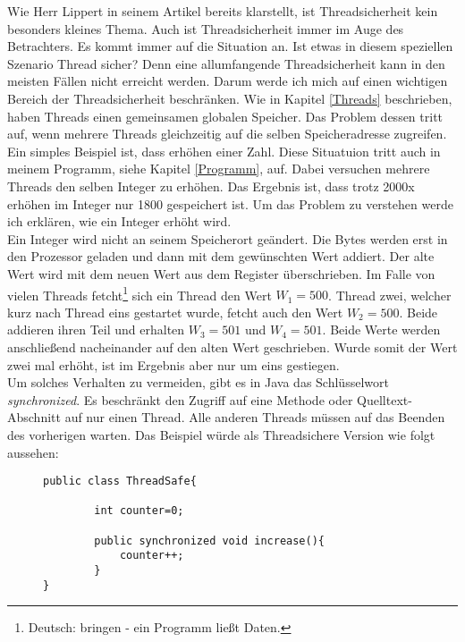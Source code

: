 Wie Herr Lippert in seinem Artikel bereits klarstellt, ist Threadsicherheit kein besonders kleines Thema. Auch ist Threadsicherheit immer im Auge des Betrachters. Es kommt immer auf die Situation an. Ist etwas in diesem speziellen Szenario Thread sicher? Denn eine allumfangende Threadsicherheit kann in den meisten Fällen nicht erreicht werden. Darum werde ich mich auf einen wichtigen Bereich der Threadsicherheit beschränken.
\medskip
\newline
Wie in Kapitel \ref{Threads} beschrieben, haben Threads einen gemeinsamen globalen Speicher. Das Problem dessen tritt auf, wenn mehrere Threads gleichzeitig auf die selben Speicheradresse zugreifen. Ein simples Beispiel ist, dass erhöhen einer Zahl. Diese Situatuion tritt auch in meinem Programm, siehe Kapitel \ref{Programm}, auf. Dabei versuchen mehrere Threads den selben Integer zu erhöhen. Das Ergebnis ist, dass trotz 2000x erhöhen im Integer nur 1800 gespeichert ist. Um das Problem zu verstehen werde ich erklären, wie ein Integer erhöht wird.\\
Ein Integer wird nicht an seinem Speicherort geändert. Die Bytes werden erst in den Prozessor geladen und dann mit dem gewünschten Wert addiert. Der alte Wert wird mit dem neuen Wert aus dem Register überschrieben. Im Falle von vielen Threads fetcht\footnote{Deutsch: bringen - ein Programm ließt Daten.} sich ein Thread den Wert $W_1 = 500$. Thread zwei, welcher kurz nach Thread eins gestartet wurde, fetcht auch den Wert $W_2 = 500$. Beide addieren ihren Teil und erhalten $W_3 = 501$ und $W_4 = 501$. Beide Werte werden anschließend nacheinander auf den alten Wert geschrieben. Wurde somit der Wert zwei mal erhöht, ist im Ergebnis aber nur um eins gestiegen.\cite{ThreadInterference:Oracle}\\
Um solches Verhalten zu vermeiden, gibt es in Java das Schlüsselwort \textit{synchronized}. Es beschränkt den Zugriff auf eine Methode oder Quelltext-Abschnitt auf nur einen Thread. Alle anderen Threads müssen auf das Beenden des vorherigen warten. Das Beispiel würde als Threadsichere Version wie folgt aussehen: \cite{SynchronizedMethods:Oracle}
\begin{figure}[h]
    \begin{lstlisting}
public class ThreadSafe{

        int counter=0;

        public synchronized void increase(){
            counter++;
        }
}
    \end{lstlisting}
\end{figure}